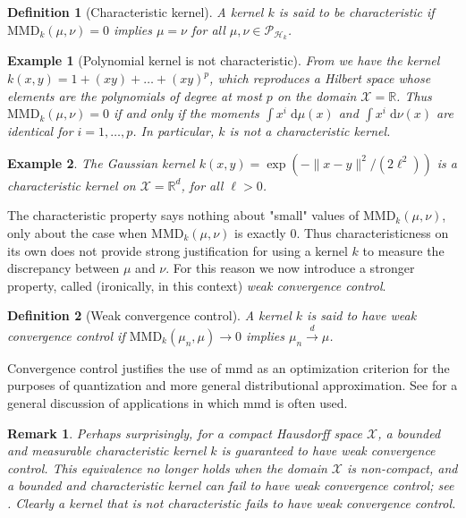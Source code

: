 \documentclass[12pt,paper=letter]{scrreprt}
\newtheorem{remark}{Remark}[chapter]
\newtheorem{definition}{Definition}[chapter]
\newtheorem{example}{Example}[chapter]
\begin{document}
\begin{definition}[Characteristic kernel]
\label{def: char kernel}
A kernel $k$ is said to be \emph{characteristic} if $\mathrm{MMD}_k(\mu,\nu) = 0$ implies $\mu = \nu$ for all $\mu,\nu \in \mathcal{P}_{\mathcal{H}_k}$.
\end{definition}

\begin{example}[Polynomial kernel is not characteristic] \label{ex: poly not char}
From  we have the kernel $k(x,y) = 1 + (xy) + \dots + (xy)^p$, which reproduces a Hilbert space whose elements are the polynomials of degree at most $p$ on the domain $\mathcal{X} = \mathbb{R}$.
Thus $\mathrm{MMD}_k(\mu,\nu) = 0$ if and only if the moments $\int x^i \; \mathrm{d}\mu(x)$ and $\int x^i \; \mathrm{d}\nu(x)$ are identical for $i = 1,\dots,p$.
In particular, $k$ is \emph{not} a characteristic kernel.
\end{example}

\begin{example}
The Gaussian kernel $k(x,y) = \exp(-\|x-y\|^2 / (2\ell^2))$ is a characteristic kernel on $\mathcal{X} = \mathbb{R}^d$, for all $\ell > 0$.
\end{example}


The characteristic property says nothing about "small" values of $\mathrm{MMD}_k(\mu,\nu)$, only about the case when $\mathrm{MMD}_k(\mu,\nu)$ is exactly 0.
Thus characteristicness on its own does not provide strong justification for using a kernel $k$ to measure the discrepancy between $\mu$ and $\nu$.
For this reason we now introduce a stronger property, called (ironically, in this context) \textit{weak convergence control}.

\begin{definition}[Weak convergence control]
A kernel $k$ is said to have \emph{weak convergence control} if $\mathrm{MMD}_k(\mu_n,\mu) \rightarrow 0$ implies $\mu_n \stackrel{d}{\rightarrow} \mu$.
\end{definition}

\noindent Convergence control justifies the use of \ac{mmd} as an optimization criterion for the purposes of quantization and more general distributional approximation.
See \citet{muandet2016kernel} for a general discussion of applications in which \ac{mmd} is often used.

\begin{remark}
Perhaps surprisingly, for a compact Hausdorff space $\mathcal{X}$, a bounded and measurable characteristic kernel $k$ is guaranteed to have weak convergence control.
This equivalence no longer holds when the domain $\mathcal{X}$ is non-compact, and a bounded and characteristic kernel can fail to have weak convergence control; see \citet{simon2020metrizing}.
Clearly a kernel that is not characteristic fails to have weak convergence control.
\end{remark}
\end{document}
